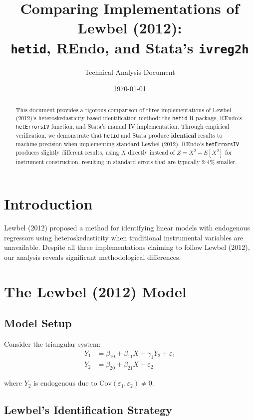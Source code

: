 \documentclass[12pt]{article}
\title{Comparing Implementations of Lewbel (2012):\\
\texttt{hetid}, REndo, and Stata's \texttt{ivreg2h}}
\author{Technical Analysis Document}
\date{\today}
\begin{document}
\maketitle

\begin{abstract}
This document provides a rigorous comparison of three implementations of Lewbel (2012)'s heteroskedasticity-based identification method: the \texttt{hetid} R package, REndo's \texttt{hetErrorsIV} function, and Stata's manual IV implementation. Through empirical verification, we demonstrate that \texttt{hetid} and Stata produce \textbf{identical} results to machine precision when implementing standard Lewbel (2012). REndo's \texttt{hetErrorsIV} produces slightly different results, using $X$ directly instead of $Z = X^2 - E[X^2]$ for instrument construction, resulting in standard errors that are typically 2-4\% smaller.
\end{abstract}

\section{Introduction}

Lewbel (2012) proposed a method for identifying linear models with endogenous regressors using heteroskedasticity when traditional instrumental variables are unavailable. Despite all three implementations claiming to follow Lewbel (2012), our analysis reveals significant methodological differences.

\section{The Lewbel (2012) Model}

\subsection{Model Setup}

Consider the triangular system:
\begin{align}
Y_1 &= \beta_{10} + \beta_{11}X + \gamma_1 Y_2 + \varepsilon_1 \label{eq:structural}\\
Y_2 &= \beta_{20} + \beta_{21}X + \varepsilon_2 \label{eq:first-stage}
\end{align}

where $Y_2$ is endogenous due to $\text{Cov}(\varepsilon_1, \varepsilon_2) \neq 0$.

\subsection{Lewbel's Identification Strategy}
\end{document}
